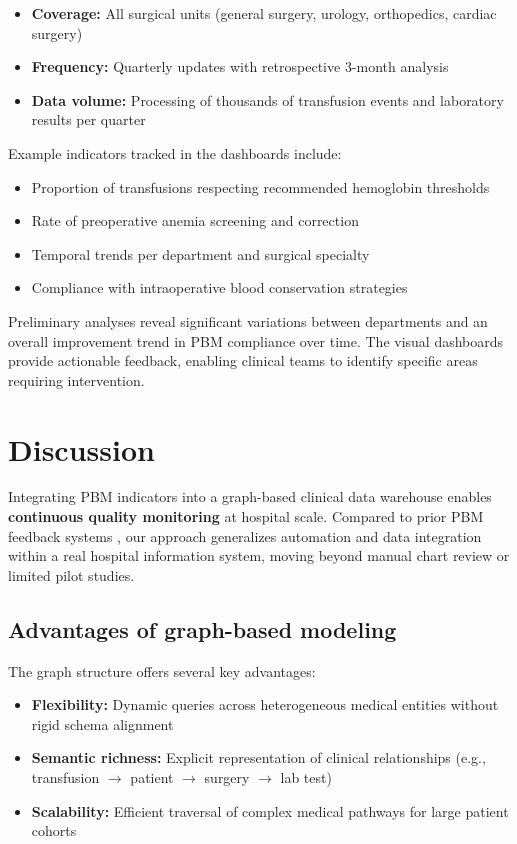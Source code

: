 \documentclass{IOS-Book-Article}
\begin{document}
\begin{itemize}
\item \textbf{Coverage:} All surgical units (general surgery, urology, orthopedics, cardiac surgery)
\item \textbf{Frequency:} Quarterly updates with retrospective 3-month analysis
\item \textbf{Data volume:} Processing of thousands of transfusion events and laboratory results per quarter
\end{itemize}

Example indicators tracked in the dashboards include:

\begin{itemize}
\item Proportion of transfusions respecting recommended hemoglobin thresholds
\item Rate of preoperative anemia screening and correction
\item Temporal trends per department and surgical specialty
\item Compliance with intraoperative blood conservation strategies
\end{itemize}

Preliminary analyses reveal significant variations between departments and an overall improvement trend in PBM compliance over time. The visual dashboards provide actionable feedback, enabling clinical teams to identify specific areas requiring intervention.

\section{Discussion}

Integrating PBM indicators into a graph-based clinical data warehouse enables \textbf{continuous quality monitoring} at hospital scale. Compared to prior PBM feedback systems \cite{Mehra2015}, our approach generalizes automation and data integration within a real hospital information system, moving beyond manual chart review or limited pilot studies.

\subsection{Advantages of graph-based modeling}

The graph structure offers several key advantages:

\begin{itemize}
\item \textbf{Flexibility:} Dynamic queries across heterogeneous medical entities without rigid schema alignment
\item \textbf{Semantic richness:} Explicit representation of clinical relationships (e.g., transfusion $\rightarrow$ patient $\rightarrow$ surgery $\rightarrow$ lab test)
\item \textbf{Scalability:} Efficient traversal of complex medical pathways for large patient cohorts
\end{itemize}
\end{document}

